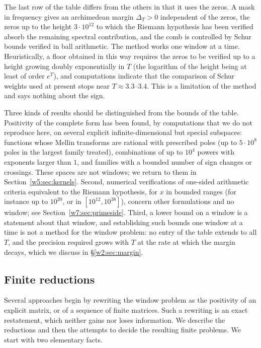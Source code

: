 \documentclass[11pt]{amsart}
\theoremstyle{definition}
\theoremstyle{remark}
\numberwithin{equation}{section}
\begin{document}
The last row of the table differs from the others in that it uses the zeros. A mask in frequency gives an archimedean
margin $\Delta_T>0$ independent of the zeros, the zeros up to the height $3\cdot10^{12}$ to which the Riemann
hypothesis has been verified \cite{PlattTrudgian2021} absorb the remaining spectral contribution, and the comb is
controlled by Schur bounds verified in ball arithmetic. The method works one window at a time. Heuristically, a floor
obtained in this way requires the zeros to be verified up to a height growing doubly exponentially in $T$ (the
logarithm of the height being at least of order $e^{T}$), and computations indicate that the comparison of Schur
weights used at present stops near $T\approx3.3$--$3.4$. This is a limitation of the method and says nothing about the
sign.

Three kinds of results should be distinguished from the bounds of the table. Positivity of the complete form has been
found, by computations that we do not reproduce here, on several explicit infinite-dimensional but special subspaces: functions whose
Mellin transforms are rational with prescribed poles (up to $5\cdot10^8$ poles in the largest family treated),
combinations of up to $10^4$ powers with exponents larger than $1$, and families with a bounded number of sign changes
or crossings. These spaces are not windows; we return to them in Section~\ref{w5:sec:kernels}. Second, numerical
verifications of one-sided arithmetic criteria equivalent to the Riemann hypothesis, for $x$ in bounded ranges (for
instance up to $10^{20}$, or in $[10^{12},10^{38}]$), concern other formulations and no window; see
Section~\ref{w7:sec:primeside}. Third, a lower bound on a window is a statement about that window, and establishing
such bounds one window at a time is not a method for the window problem: no entry of the table extends to all $T$, and
the precision required grows with $T$ at the rate at which the margin decays, which we discuss in
\S\ref{w2:sec:margin}.

\subsection{Finite reductions}\label{w2:sec:reductions}

Several approaches begin by rewriting the window problem as the positivity of an explicit matrix, or of a sequence of
finite matrices. Such a rewriting is an exact restatement, which neither gains nor loses information. We describe the
reductions and then the attempts to decide the resulting finite problems. We start with two elementary facts.
\end{document}
